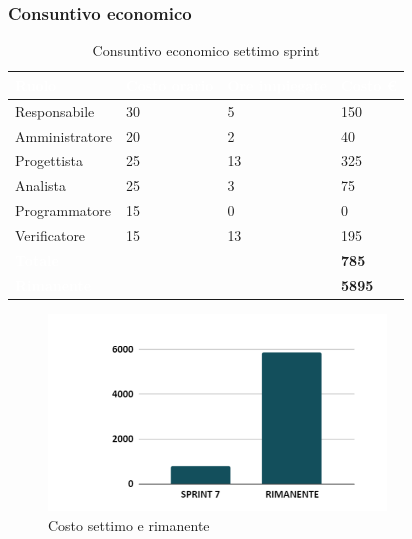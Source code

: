 \newpage
\subsubsection{Consuntivo economico}
{
\setlength{\tabcolsep}{10pt}
\renewcommand{\arraystretch}{1.5}
\begin{table}[h]
    \centering
    \begin{tabularx}{\textwidth}{| l | l | l | X |}
        \hline
        \rowcolor{headerrow} \textbf{\textcolor{white}{Ruolo}} & \textbf{\textcolor{white}{Costo orario}} & \textbf{\textcolor{white}{Ore impiegate}} & \textbf{\textcolor{white}{Costo €}} \\
        \hline
        Responsabile & 30 & 5 & 150\\
        \hline
        Amministratore & 20 & 2 & 40\\
        \hline
        Progettista & 25 & 13 & 325\\
        \hline
        Analista & 25 & 3 & 75\\
        \hline
        Programmatore & 15 & 0 & 0\\
        \hline
        Verificatore & 15 & 13 & 195\\
        \hline
        \cellcolor{headerrow} \textbf{\textcolor{white}{Totale}} &  &  & \textbf{785}\\
        \hline
        \cellcolor{headerrow} \textbf{\textcolor{white}{Rimanente}} &  &  & \textbf{5895}\\
        \hline
    \end{tabularx}
    \caption{Consuntivo economico settimo sprint}
    \label{tab:consuntivocostisettimosprint}
\end{table}
}

\begin{figure}[h!]
    \centering
    \includegraphics[width=0.8\textwidth]{cons7costo.png}
    \caption{Costo settimo e rimanente}
    \label{fig:consuntivocostosettimosprint}
\end{figure}

